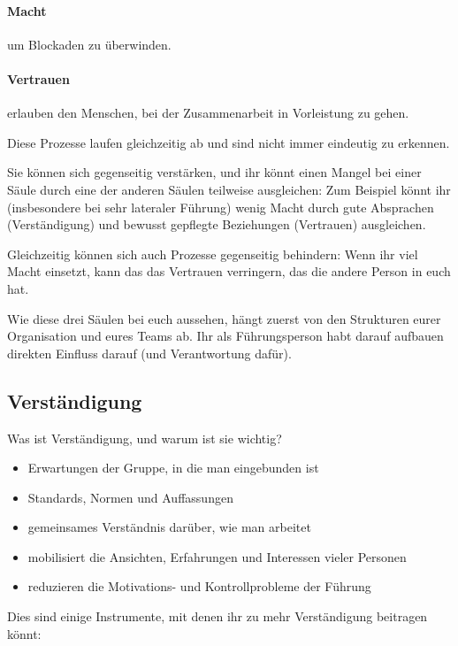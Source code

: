 \paragraph{Macht} um Blockaden zu überwinden.

\paragraph{Vertrauen} erlauben den Menschen, bei der Zusammenarbeit in Vorleistung zu gehen.

Diese Prozesse laufen gleichzeitig ab und sind nicht immer eindeutig zu erkennen.

Sie können sich gegenseitig verstärken, und ihr könnt einen Mangel bei einer Säule durch eine der anderen Säulen teilweise ausgleichen: Zum Beispiel könnt ihr (insbesondere bei sehr lateraler Führung) wenig Macht durch gute Absprachen (Verständigung) und bewusst gepflegte Beziehungen (Vertrauen) ausgleichen.

Gleichzeitig können sich auch Prozesse gegenseitig behindern: Wenn ihr viel Macht einsetzt, kann das das Vertrauen verringern, das die andere Person in euch hat.

Wie diese drei Säulen bei euch aussehen, hängt zuerst von den Strukturen eurer Organisation und eures Teams ab. Ihr als Führungsperson habt darauf aufbauen direkten Einfluss darauf (und Verantwortung dafür).


\subsection{Verständigung}

Was ist Verständigung, und warum ist sie wichtig?

\begin{itemize}
  \item Erwartungen der Gruppe, in die man eingebunden ist
  \item Standards, Normen und Auffassungen
  \item gemeinsames Verständnis darüber, wie man arbeitet
  \item mobilisiert die Ansichten, Erfahrungen und Interessen vieler Personen
  \item reduzieren die Motivations- und Kontrollprobleme der Führung
\end{itemize}

Dies sind einige Instrumente, mit denen ihr zu mehr Verständigung beitragen könnt:

